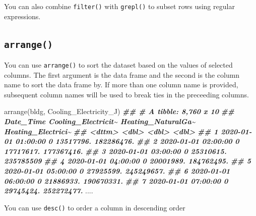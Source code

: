 \documentclass[
]{book}
\newenvironment{Shaded}{\begin{snugshade}}{\end{snugshade}}
\newcommand{\DocumentationTok}[1]{\textcolor[rgb]{0.56,0.35,0.01}{\textbf{\textit{#1}}}}
\newcommand{\FunctionTok}[1]{\textcolor[rgb]{0.00,0.00,0.00}{#1}}
\newcommand{\NormalTok}[1]{#1}
\begin{document}
You can also combine \texttt{filter()} with \texttt{grepl()} to subset rows using regular expressions.

\hypertarget{arrange}{%
\subsection{\texorpdfstring{\texttt{arrange()}}{arrange()}}\label{arrange}}

You can use \texttt{arrange()} to sort the dataset based on the values of selected columns. The first argument is the data frame and the second is the column name to sort the data frame by. If more than one column name is provided, subsequent column names will be used to break ties in the preceeding columns.

\begin{Shaded}
\begin{Highlighting}[]
\FunctionTok{arrange}\NormalTok{(bldg, Cooling\_Electricity\_J)}
\DocumentationTok{\#\# \# A tibble: 8,760 x 10}
\DocumentationTok{\#\#    Date\_Time           Cooling\_Electricit\textasciitilde{} Heating\_NaturalGa\textasciitilde{} Heating\_Electrici\textasciitilde{}}
\DocumentationTok{\#\#    \textless{}dttm\textgreater{}                            \textless{}dbl\textgreater{}              \textless{}dbl\textgreater{}              \textless{}dbl\textgreater{}}
\DocumentationTok{\#\#  1 2020{-}01{-}01 01:00:00                   0          13517796.         182286476.}
\DocumentationTok{\#\#  2 2020{-}01{-}01 02:00:00                   0          17717617.         177367416.}
\DocumentationTok{\#\#  3 2020{-}01{-}01 03:00:00                   0          25310615.         235785509 }
\DocumentationTok{\#\#  4 2020{-}01{-}01 04:00:00                   0          20001989.         184762495.}
\DocumentationTok{\#\#  5 2020{-}01{-}01 05:00:00                   0          27925599.         245249657.}
\DocumentationTok{\#\#  6 2020{-}01{-}01 06:00:00                   0          21886933.         190670331.}
\DocumentationTok{\#\#  7 2020{-}01{-}01 07:00:00                   0          29745424.         252272477.}
\NormalTok{....}
\end{Highlighting}
\end{Shaded}

You can use \texttt{desc()} to order a column in descending order
\end{document}
